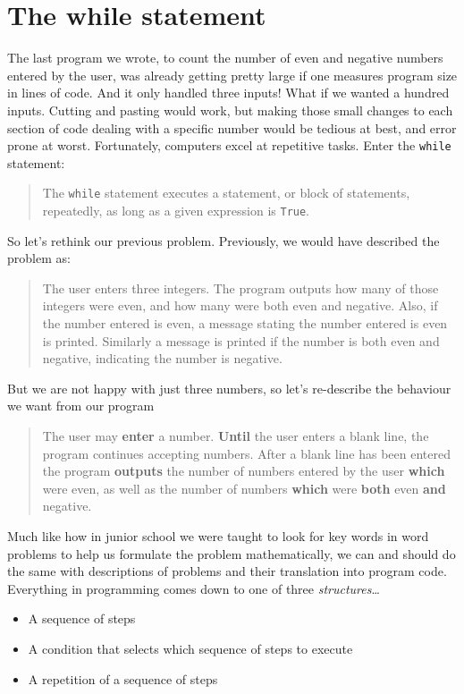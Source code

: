 \section{The while statement}

The last program we wrote, to count the number of even and negative   numbers entered by the user, was already getting pretty large if one   measures program size in lines of code. And it only handled three   inputs! What if we wanted a hundred inputs.  Cutting and pasting would   work, but making those small changes to each section of code dealing   with a specific number would be tedious at best, and error prone at   worst. Fortunately, computers excel at repetitive tasks.     Enter the \texttt{while} statement:

\begin{quotation}The \texttt{while} statement executes a statement, or block of statements,   repeatedly, as long as a given expression is \texttt{True}. \end{quotation}

So let's rethink our   previous problem. Previously, we would have described the problem as:
\begin{quotation}     The user enters three integers. The program outputs how many of    those integers were even, and how many were both even and negative.    Also, if the number entered is even, a message stating the number    entered is even is printed. Similarly a message is printed if the    number is both even and negative, indicating the number is    negative.    
\end{quotation}

But we are not happy with just three numbers, so let's re-describe   the behaviour we want from our program
\begin{quotation}     The user may \textbf{enter} a number.    \textbf{Until} the user enters a blank line, the program    continues accepting numbers. After a blank line has been entered    the program \textbf{outputs} the number of numbers entered    by the user \textbf{which} were even, as well as the number    of numbers \textbf{which} were \textbf{both} even \textbf{and}    negative.    
\end{quotation}

Much like how in junior school we were taught to look for key words   in word problems to help us formulate the problem mathematically, we   can and should do the same with descriptions of problems and their   translation into program code. Everything in programming comes down to   one of three \textit{structures}\ldots
\begin{itemize}
	\item A sequence of steps
	\item A condition that selects which sequence of steps to    execute
	\item A repetition of a sequence of steps
\end{itemize}


